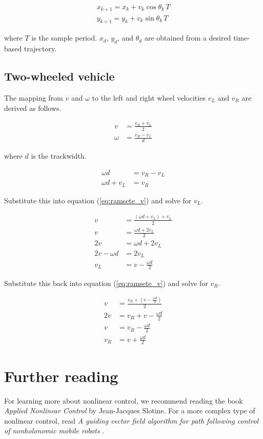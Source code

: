 \begin{align*}
  x_{k+1} = x_k + v_k\cos\theta_k\,T \\
  y_{k+1} = y_k + v_k\sin\theta_k\,T
\end{align*}

where $T$ is the sample period. $x_d$, $y_d$, and $\theta_d$ are obtained from a
desired time-based trajectory.

\subsection{Two-wheeled vehicle}

The mapping from $v$ and $\omega$ to the left and right wheel velocities $v_L$
and $v_R$ are derived as follows.

\begin{align}
  v &= \frac{v_R + v_L}{2} \label{eq:ramsete_v} \\
  \omega &= \frac{v_R - v_L}{d} \label{eq:ramsete_w}
\end{align}

where $d$ is the trackwidth.

\begin{align*}
  \omega d &= v_R - v_L \\
  \omega d + v_L &= v_R
\end{align*}

Substitute this into equation (\ref{eq:ramsete_v}) and solve for $v_L$.

\begin{align}
  v &= \frac{(\omega d + v_L) + v_L}{2} \nonumber \\
  v &= \frac{\omega d + 2v_L}{2} \nonumber \\
  2v &= \omega d + 2v_L \nonumber \\
  2v - \omega d &= 2v_L \nonumber \\
  v_L &= v - \frac{\omega d}{2}
\end{align}

Substitute this back into equation (\ref{eq:ramsete_v}) and solve for $v_R$.

\begin{align}
  v &= \frac{v_R + (v - \frac{\omega d}{2})}{2} \nonumber \\
  2v &= v_R + v - \frac{\omega d}{2} \nonumber \\
  v &= v_R - \frac{\omega d}{2} \nonumber \\
  v_R &= v + \frac{\omega d}{2}
\end{align}

\section{Further reading}

For learning more about nonlinear control, we recommend reading the book
\textit{Applied Nonlinear Control} by Jean-Jacques Slotine. For a more complex
type of nonlinear control, read \textit{A guiding vector field algorithm for
path following control of nonholonomic mobile robots} \cite{bib:gvf}.
